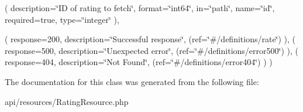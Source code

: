 ( description=\char`\"{}\+I\+D of rating to fetch\char`\"{}, format=\char`\"{}int64\char`\"{}, in=\char`\"{}path\char`\"{}, name=\char`\"{}id\char`\"{}, required=true, type=\char`\"{}integer\char`\"{} ),

( response=200, description=\char`\"{}\+Successful response\char`\"{}, (ref=\char`\"{}\#/definitions/rate\char`\"{}) ), ( response=500, description=\char`\"{}\+Unexpected error\char`\"{}, (ref=\char`\"{}\#/definitions/error500\char`\"{}) ), ( response=404, description=\char`\"{}\+Not Found\char`\"{}, (ref=\char`\"{}\#/definitions/error404\char`\"{}) ) ) 


The documentation for this class was generated from the following file\+:\begin{DoxyCompactItemize}
\item 
api/resources/Rating\+Resource.\+php\end{DoxyCompactItemize}

